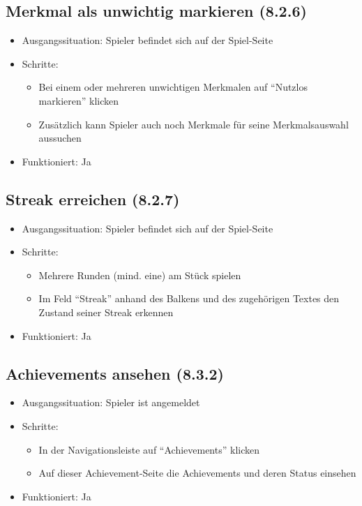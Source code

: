 \documentclass[a4paper]{scrreprt}
\begin{document}
            \subsection{Merkmal als unwichtig markieren (8.2.6)}
            \begin{itemize}
                \item Ausgangssituation: Spieler befindet sich auf der Spiel-Seite
                \item Schritte:
                    \begin{itemize}
                        \item Bei einem oder mehreren unwichtigen Merkmalen auf \enquote{Nutzlos markieren} klicken
                        \item Zusätzlich kann Spieler auch noch Merkmale für seine Merkmalsauswahl aussuchen
                    \end{itemize}
                \item Funktioniert: Ja
            \end{itemize}

            \subsection{Streak erreichen (8.2.7)}
            \begin{itemize}
                \item Ausgangssituation: Spieler befindet sich auf der Spiel-Seite
                \item Schritte:
                    \begin{itemize}
                        \item Mehrere Runden (mind. eine) am Stück spielen
                        \item Im Feld \enquote{Streak} anhand des Balkens und des zugehörigen Textes den Zustand seiner Streak erkennen
                    \end{itemize}
                    \item Funktioniert: Ja
            \end{itemize}

            \subsection{Achievements ansehen (8.3.2)}
            \begin{itemize}
                \item Ausgangssituation: Spieler ist angemeldet
                \item Schritte:
                    \begin{itemize}
                        \item In der Navigationsleiste auf \enquote{Achievements} klicken
                        \item Auf dieser Achievement-Seite die Achievements und deren Status einsehen
                    \end{itemize}
                \item Funktioniert: Ja
            \end{itemize}
\end{document}
